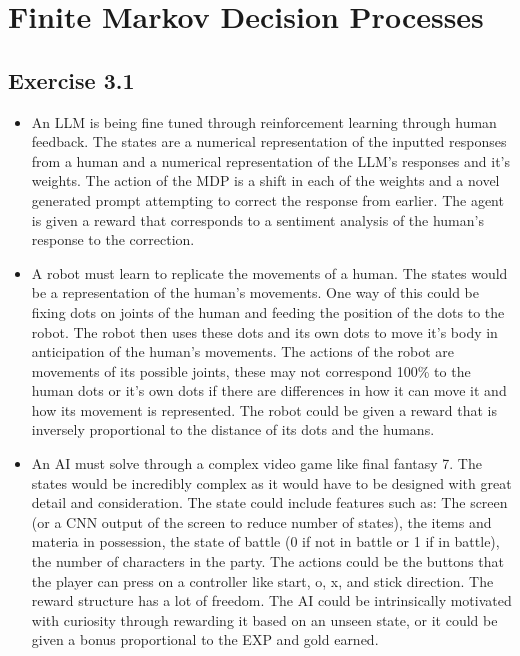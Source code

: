 \section{Finite Markov Decision Processes}

\subsection{Exercise 3.1}
\begin{itemize}
  \item An LLM is being fine tuned through reinforcement learning through human feedback. The states are a numerical representation of the inputted responses from a human and a numerical representation of the LLM's responses and it's weights. The action of the MDP is a shift in each of the weights and a novel generated prompt attempting to correct the response from earlier. The agent is given a reward that corresponds to a sentiment analysis of the human's response to the correction.
  \item A robot must learn to replicate the movements of a human. The states would be a representation of the human's movements. One way of this could be fixing dots on joints of the human and feeding the position of the dots to the robot. The robot then uses these dots and its own dots to move it's body in anticipation of the human's movements. The actions of the robot are movements of its possible joints, these may not correspond 100\% to the human dots or it's own dots if there are differences in how it can move it and how its movement is represented. The robot could be given a reward that is inversely proportional to the distance of its dots and the humans.  
  \item An AI must solve through a complex video game like final fantasy 7. The states would be incredibly complex as it would have to be designed with great detail and consideration. The state could include features such as: The screen (or a CNN output of the screen to reduce number of states), the items and materia in possession, the state of battle (0 if not in battle or 1 if in battle), the number of characters in the party. The actions could be the buttons that the player can press on a controller like start, o, x, and stick direction. The reward structure has a lot of freedom. The AI could be intrinsically motivated with curiosity through rewarding it based on an unseen state, or it could be given a bonus proportional to the EXP and gold earned.   
\end{itemize}

